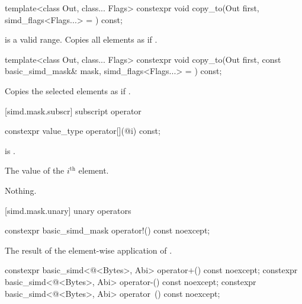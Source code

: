 \begin{itemdecl}
template<class Out, class... Flags>
  constexpr void copy_to(Out first, simd_flags<Flags...> = {}) const;
\end{itemdecl}

\begin{itemdescr}
  \MaskStoreDescr
    { is a valid range.}
    {Copies all  elements as if 
    \foralli.}
\end{itemdescr}

\begin{itemdecl}
template<class Out, class... Flags>
  constexpr void copy_to(Out first, const basic_simd_mask& mask, simd_flags<Flags...> = {}) const;
\end{itemdecl}

\begin{itemdescr}
  \MaskStoreDescr
  {\validMaskedRange}
  {Copies the selected elements as if  \forallmaskedi.}
\end{itemdescr}

[simd.mask.subscr]{ subscript operator}

\begin{itemdecl}
constexpr value_type operator[](@\simdsizetype@ i) const;
\end{itemdecl}

\begin{itemdescr}
  \pnum\expects
   is .

  \pnum\returns
  The value of the $i^\text{th}$ element.

  \pnum\throws Nothing.
\end{itemdescr}

[simd.mask.unary]{ unary operators}

\begin{itemdecl}
constexpr basic_simd_mask operator!() const noexcept;
\end{itemdecl}

\begin{itemdescr}
  \pnum\returns
  The result of the element-wise application of .
\end{itemdescr}

\begin{itemdecl}
constexpr basic_simd<@\integerfrom@<Bytes>, Abi> operator+() const noexcept;
constexpr basic_simd<@\integerfrom@<Bytes>, Abi> operator-() const noexcept;
constexpr basic_simd<@\integerfrom@<Bytes>, Abi> operator~() const noexcept;
\end{itemdecl}

